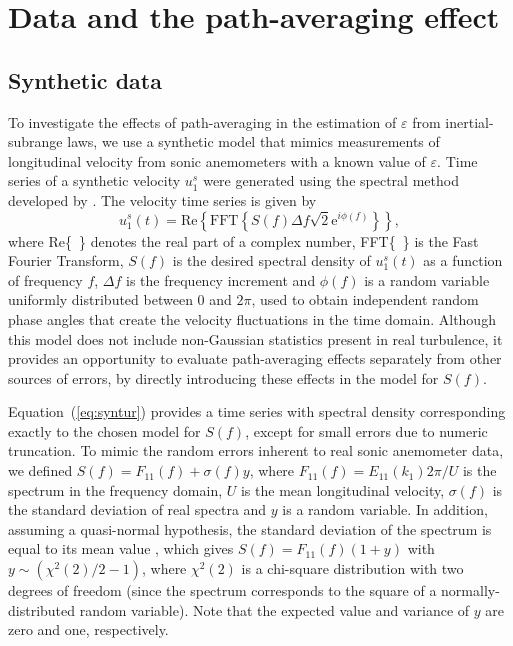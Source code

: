\documentclass{svjour3}                     %
\begin{document}
\section{Data and the path-averaging effect}

\subsection{Synthetic data}

To investigate the effects of path-averaging in the estimation of
$\varepsilon$ from inertial-subrange laws, we use a synthetic model
that mimics measurements of longitudinal velocity from sonic
anemometers with a known value of $\varepsilon$. Time series of a
synthetic velocity $u_1^s$ were generated using the spectral method
developed by \citet{ShiDeo1991}. The velocity time series is given by
\begin{equation}
  u_1^s(t) = \mathrm{Re}\left\{\mathrm{FFT}\left\{S(f) \Delta f \sqrt{2} \mathrm{e}^{i\phi(f)}\right\}\right\}, \label{eq:syntur}
\end{equation}
where Re\{\,\,\,\} denotes the real part of a complex number, FFT\{\,\,\,\} is
the Fast Fourier Transform, $S(f)$ is the desired spectral density of $u_1^s(t)$
as a function of frequency $f$, $\Delta f$ is the frequency increment and
$\phi(f)$ is a random variable uniformly distributed between 0 and $2\pi$, used
to obtain independent random phase angles that create the velocity fluctuations
in the time domain. Although this model does not include non-Gaussian
statistics present in real turbulence, it provides an opportunity to evaluate
path-averaging effects separately from other sources of errors, by directly
introducing these effects in the model for $S(f)$.

Equation~(\ref{eq:syntur}) provides a time series with spectral
density corresponding exactly to the chosen model for $S(f)$, except
for small errors due to numeric truncation. To mimic the random errors
inherent to real sonic anemometer data, we defined $S(f) = F_{11}(f) +
\sigma(f)y$, where $F_{11}(f) = E_{11}(k_1) 2\pi/U$ is the spectrum in
the frequency domain, $U$ is the mean longitudinal velocity,
$\sigma(f)$ is the standard deviation of real spectra and $y$ is a
random variable. In addition, assuming a quasi-normal hypothesis, the
standard deviation of the spectrum is equal to its mean value
\citep{BenPie2010,Dia2017}, which gives $S(f) = F_{11}(f)(1 + y)$ with
$y \sim (\chi^2(2)/2 - 1)$, where $\chi^2(2)$ is a chi-square
distribution with two degrees of freedom (since the spectrum
corresponds to the square of a normally-distributed random
variable). Note that the expected value and variance of $y$ are zero
and one, respectively.
\end{document}
